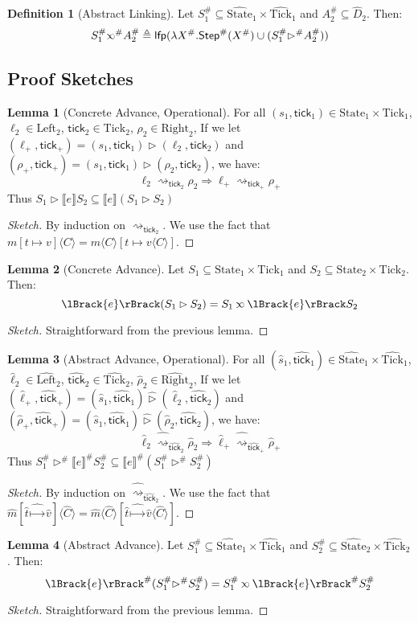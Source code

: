 \documentclass{article}
\theoremstyle{definition}
\newtheorem{definition}{Definition}[section]
\newtheorem{lem}{Lemma}[section]
\newcommand*{\A}[1]{\widehat{#1}}
\newcommand*{\Abs}[1]{{#1}^{\#}}
\newcommand*{\Left}{\text{Left}}
\newcommand*{\Right}{\text{Right}}
\newcommand*{\mem}{m}
\newcommand*{\State}{\text{State}}
\newcommand*{\AState}{\widehat{\text{State}}}
\newcommand*{\Tick}{\text{Tick}}
\newcommand*{\Step}{\mathsf{Step}}
\newcommand*{\semarrow}{\rightsquigarrow}
\newcommand*{\semlink}{\mathbin{\rotatebox[origin=c]{180}{$\propto$}}}
\newcommand*{\sembracket}[1]{\lBrack{#1}\rBrack}
\newcommand*{\tick}{\mathsf{tick}}
\newcommand*{\inject}[2]{{#2}\langle{#1}\rangle}
\begin{document}
\begin{definition}[Abstract Linking]
  Let $\Abs{S}_1\subseteq\A\State_1\times\A\Tick_1$ and $\Abs{A}_2\subseteq \A{D}_2$.
  Then:
  \[
    \Abs{S}_1\Abs\semlink\Abs{A}_2\triangleq
    \mathsf{lfp}(\lambda \Abs{X}.\Abs\Step(\Abs{X})\cup(\Abs{S}_1\Abs\rhd \Abs{A}_2))
  \]
\end{definition}

\subsection{Proof Sketches}
\begin{lem}[Concrete Advance, Operational]
  For all $(s_1,\tick_1)\in\State_1\times\Tick_1$, $\ell_2\in\Left_2$, $\tick_2\in\Tick_2$, $\rho_2\in\Right_2$,
  If we let $(\ell_+,\tick_+)=(s_1,\tick_1)\rhd(\ell_2,\tick_2)$ and $(\rho_+,\tick_+)=(s_1,\tick_1)\rhd(\rho_2,\tick_2)$, we have:
  \[
    \ell_2\semarrow_{\tick_2}\rho_2\Rightarrow\ell_+\semarrow_{\tick_+}\rho_+
  \]
  Thus $S_1\rhd\sembracket{e}S_2\subseteq\sembracket{e}(S_1\rhd S_2)$
\end{lem}
\begin{proof}[Sketch]
  By induction on $\semarrow_{\tick_2}$.
  We use the fact that $\inject{C}{\mem[t\mapsto v]}=\inject{C}{\mem}[t\mapsto\inject{C}{v}]$.
\end{proof}
\begin{lem}[Concrete Advance]
  Let $S_1\subseteq\State_1\times\Tick_1$ and $S_2\subseteq\State_2\times\Tick_2$. Then:
  \[
    \sembracket{e}(S_1\rhd S_2)=S_1\semlink\sembracket{e}S_2
  \]
\end{lem}
\begin{proof}[Sketch]
  Straightforward from the previous lemma.
\end{proof}
\begin{lem}[Abstract Advance, Operational]
  For all $(\A{s}_1,\A\tick_1)\in\AState_1\times\A\Tick_1$, $\A\ell_2\in\A\Left_2$, $\A\tick_2\in\A\Tick_2$, $\A\rho_2\in\A\Right_2$,
  If we let $(\A\ell_+,\A\tick_+)=(\A{s}_1,\A\tick_1)\A\rhd(\A\ell_2,\A\tick_2)$ and $(\A\rho_+,\A\tick_+)=(\A{s}_1,\A\tick_1)\A\rhd(\A\rho_2,\A\tick_2)$, we have:
  \[
    \A\ell_2\A\semarrow_{\A\tick_2}\A\rho_2\Rightarrow\A\ell_+\A\semarrow_{\A\tick_+}\A\rho_+
  \]
  Thus $\Abs{S}_1\Abs\rhd\Abs{\sembracket{e}}\Abs{S}_2\subseteq\Abs{\sembracket{e}}(\Abs{S}_1\Abs\rhd \Abs{S}_2)$
\end{lem}
\begin{proof}[Sketch]
  By induction on $\A\semarrow_{\A\tick_2}$.
  We use the fact that $\inject{\A{C}}{\A\mem[\A{t}\A\mapsto\A{v}]}=\inject{\A{C}}{\A\mem}[\A{t}\A\mapsto\inject{\A{C}}{\A{v}}]$.
\end{proof}
\begin{lem}[Abstract Advance]
  Let $\Abs{S}_1\subseteq\AState_1\times\A\Tick_1$ and $\Abs{S}_2\subseteq\AState_2\times\A\Tick_2$. Then:
  \[
    \Abs{\sembracket{e}}(\Abs{S}_1\Abs\rhd\Abs{S}_2)=\Abs{S}_1\semlink\Abs{\sembracket{e}}\Abs{S}_2
  \]
\end{lem}
\begin{proof}[Sketch]
  Straightforward from the previous lemma.
\end{proof}
\end{document}
